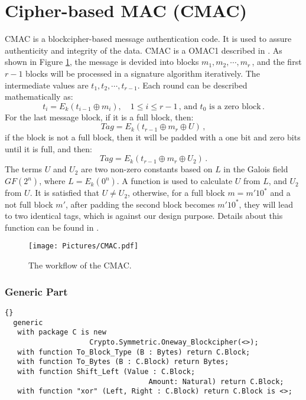 \section{Cipher-based MAC (CMAC)}
CMAC is a blockcipher-based message authentication code. It is used to assure authenticity and integrity of the data.
CMAC is a OMAC1 described in \cite{DBLP:conf/fse/2003}. As shown in Figure \ref{OMAC}, the message is devided into blocks $m_1,m_2,\cdots,m_r$\,, and the first $r-1$ blocks will be processed in a signature algorithm iteratively. The intermediate values are $t_1,t_2,\cdots, t_{r-1}$. Each round can be described mathematically as:
\begin{equation*}
t_i=E_k(t_{i-1}\oplus m_i), \quad 1\leq i \leq r-1\,,\,\mbox{and $t_0$ is a zero block}\,.
\end{equation*}
For the last message block, if it is a full block, then:
\begin{equation*}
Tag=E_k(t_{r-1}\oplus m_r \oplus U)\,,
\end{equation*}
if the block is not a full block, then it will be padded with a one bit and zero bits until it is full, and then:
\begin{equation*}
Tag=E_k(t_{r-1}\oplus m_r \oplus U_2)\,.
\end{equation*}
The terms $U$ and $U_2$ are two non-zero constants based on $L$ in the Galois
field $GF(2^n)$, where $L=E_k(0^n)$. A function is used to calculate $U$ from $L$, and $U_2$ from $U$. It is satisfied that $U\neq U_2$, otherwise, for a full block $m=m'10^*$ and a not full block $m'$, after padding the second block becomes $m'10^*$, they will lead to two identical tags, which is against our design purpose.
Details about this function can be found in \cite{DBLP:conf/fse/2003}.
\begin{figure}[h]
\centering
\texttt{[image: Pictures/CMAC.pdf]} 
\caption{The workflow of the CMAC.}\label{OMAC}
\end{figure}
\newpage
\subsubsection*{Generic Part}
\begin{lstlisting}{}
  generic
   with package C is new 
   					Crypto.Symmetric.Oneway_Blockcipher(<>);
   with function To_Block_Type (B : Bytes) return C.Block;
   with function To_Bytes (B : C.Block) return Bytes;
   with function Shift_Left (Value : C.Block; 
   								  Amount: Natural) return C.Block;
   with function "xor" (Left, Right : C.Block) return C.Block is <>;
\end{lstlisting}
